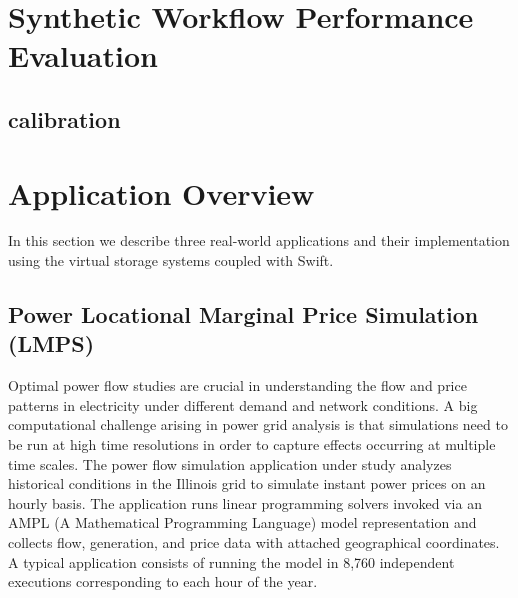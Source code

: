 \documentclass[10pt,journal,cspaper,compsoc]{IEEEtran}
\newcommand{\katznote}[1]{ {\textcolor{blue}    { ***Dan:      #1 }}}
\newcommand{\katznote}[1]{}
\begin{document}
\section{Synthetic Workflow Performance Evaluation}


\subsection{calibration}

\section{Application Overview}\label{sec:app}
In this section we describe three real-world applications and their
implementation using the virtual storage systems coupled with Swift. 

\subsection{Power Locational Marginal Price Simulation (LMPS)}
Optimal power flow studies are crucial in understanding the flow and price
patterns in electricity under different demand and network conditions. A big
computational challenge arising in power grid analysis is that simulations need
to be run at high time resolutions in order to capture effects occurring at
multiple time scales. The power flow simulation application under study
analyzes historical conditions in the Illinois grid to simulate instant power
prices on an hourly basis. The application runs linear programming solvers
invoked via an AMPL (A Mathematical Programming Language) model
representation and collects flow, generation, and price data with attached
geographical coordinates. A typical application consists of running the model
in 8,760 independent executions corresponding to each hour of the year.
%
%
\end{document}
